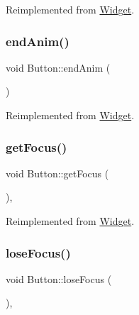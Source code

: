 Reimplemented from \mbox{\hyperlink{class_widget_ae33a60123dee736ad8ece7277711f3d4}{Widget}}.

\mbox{\label{class_button_ad0356a9996631f350fee4a02c66a4cf5}} 
\subsubsection{\texorpdfstring{endAnim()}{endAnim()}}
{\footnotesize\ttfamily void Button\+::end\+Anim (\begin{DoxyParamCaption}{ }\end{DoxyParamCaption})\hspace{0.3cm}{\ttfamily [virtual]}}



Reimplemented from \mbox{\hyperlink{class_widget_abbbedd98778706d6a7cfe2ecf27413fb}{Widget}}.

\mbox{\label{class_button_afe48c308771dd21dfa1539e930ca60b9}} 
\subsubsection{\texorpdfstring{getFocus()}{getFocus()}}
{\footnotesize\ttfamily void Button\+::get\+Focus (\begin{DoxyParamCaption}{ }\end{DoxyParamCaption})\hspace{0.3cm}{\ttfamily [override]}, {\ttfamily [virtual]}}



Reimplemented from \mbox{\hyperlink{class_widget_a546c3b96bd793596c4902b4df0c41272}{Widget}}.

\mbox{\label{class_button_a3b3550244cdb94552631a4582f4d0120}} 
\subsubsection{\texorpdfstring{loseFocus()}{loseFocus()}}
{\footnotesize\ttfamily void Button\+::lose\+Focus (\begin{DoxyParamCaption}{ }\end{DoxyParamCaption})\hspace{0.3cm}{\ttfamily [override]}, {\ttfamily [virtual]}}



